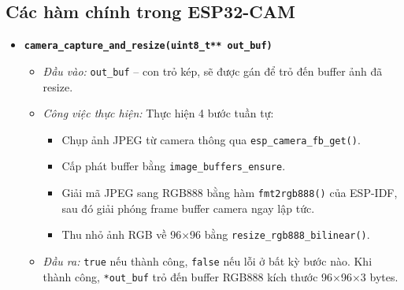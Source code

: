 \documentclass[12pt,a4paper]{report}
\begin{document}
\subsection{Các hàm chính trong ESP32-CAM}

\begin{itemize}
    \item \textbf{\texttt{camera\_capture\_and\_resize(uint8\_t** out\_buf)}}
    \begin{itemize}
        \item \textit{Đầu vào:} \texttt{out\_buf} -- con trỏ kép, sẽ được gán để
        trỏ đến buffer ảnh đã resize.
        \item \textit{Công việc thực hiện:} Thực hiện 4 bước tuần tự:
        \begin{itemize}
            \item Chụp ảnh JPEG từ camera thông qua \texttt{esp\_camera\_fb\_get()}.
            \item Cấp phát buffer bằng \texttt{image\_buffers\_ensure}.
            \item Giải mã JPEG sang RGB888 bằng hàm \texttt{fmt2rgb888()} của
            ESP-IDF, sau đó giải phóng frame buffer camera ngay lập tức.
            \item Thu nhỏ ảnh RGB về 96$\times$96 bằng
            \texttt{resize\_rgb888\_bilinear()}.
        \end{itemize}
        \item \textit{Đầu ra:} \texttt{true} nếu thành công, \texttt{false} nếu
        lỗi ở bất kỳ bước nào. Khi thành công, \texttt{*out\_buf} trỏ đến buffer
        RGB888 kích thước 96$\times$96$\times$3 bytes.
    \end{itemize}


\end{itemize}
\end{document}
